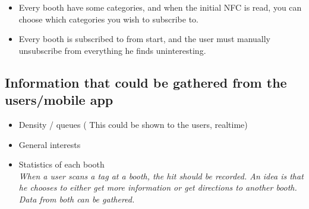 \begin{itemize}
\item Every booth have some categories, and when the initial NFC is read, you can choose which categories you wish to subscribe to.

\item Every booth is subscribed to from start, and the user must manually unsubscribe from everything he finds uninteresting.
\end{itemize}

\subsection*{Information that could be gathered from the users/mobile app}

\begin{itemize}
\item Density / queues ( This could be shown to the users, realtime)

\item General interests

\item Statistics of each booth\\
\textit{When a user scans a tag at a booth, the hit should be recorded. An idea is that he chooses to either get more information or get directions to another booth. Data from both can be gathered.}\citep{rtsbog}
\end{itemize}
